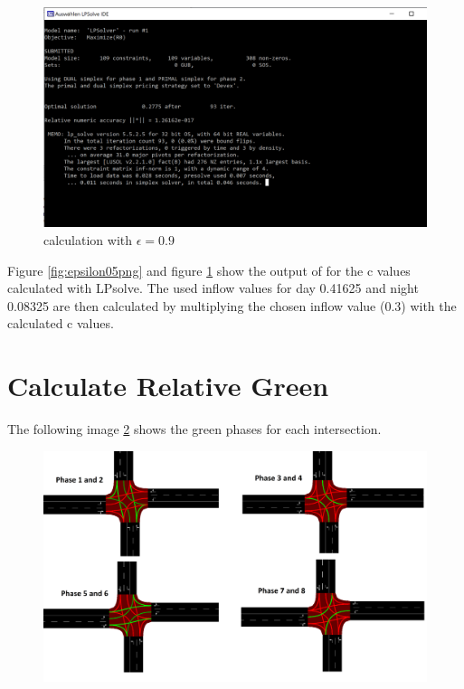 \documentclass[./\jobname.tex]{subfiles}
\begin{document}
\begin{figure}[H]
	\centering
	\includegraphics[width=0.8\linewidth]{../img/png/epsilon09.png}
	\caption{calculation with $\epsilon = 0.9$}
	\label{fig:epsilon09}
\end{figure}

Figure \ref{fig:epsilon05png} and figure \ref{fig:epsilon09} show the output of for the c values calculated with LPsolve. The used inflow values for day 0.41625 and night 0.08325 are then calculated by multiplying the chosen inflow value (0.3) with the calculated c values. 



\section{Calculate Relative Green}

The following image \ref{fig:greenphases} shows the green phases for each intersection.

\begin{figure}[H]
	\centering
	\includegraphics[width=1\linewidth]{../img/png/cross_phases.png}
	\label{fig:greenphases}
\end{figure}
\end{document}
